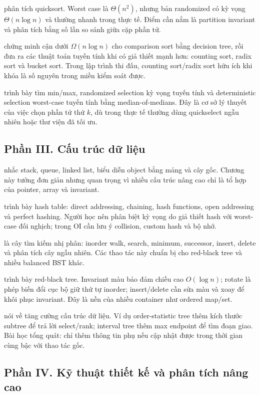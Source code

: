 \documentclass[11pt]{article}
\begin{document}
 phân tích quicksort. Worst case là \(\Theta(n^2)\), nhưng bản
randomized có kỳ vọng \(\Theta(n\log n)\) và thường nhanh trong thực tế. Điểm
cần nắm là partition invariant và phân tích bằng số lần so sánh giữa cặp phần
tử.

 chứng minh cận dưới \(\Omega(n\log n)\) cho comparison sort
bằng decision tree, rồi đưa ra các thuật toán tuyến tính khi có giả thiết mạnh
hơn: counting sort, radix sort và bucket sort. Trong lập trình thi đấu, counting
sort/radix sort hữu ích khi khóa là số nguyên trong miền kiểm soát được.

 trình bày tìm min/max, randomized selection kỳ vọng tuyến tính
và deterministic selection worst-case tuyến tính bằng median-of-medians. Đây là
cơ sở lý thuyết của việc chọn phần tử thứ \(k\), dù trong thực tế thường dùng
quickselect ngẫu nhiên hoặc thư viện đã tối ưu.

\subsection*{Phần III. Cấu trúc dữ liệu}

 nhắc stack, queue, linked list, biểu diễn object bằng mảng và
cây gốc. Chương này tưởng đơn giản nhưng quan trọng vì nhiều cấu trúc nâng cao
chỉ là tổ hợp của pointer, array và invariant.

 trình bày hash table: direct addressing, chaining, hash functions,
open addressing và perfect hashing. Người học nên phân biệt kỳ vọng do giả thiết
hash với worst-case đối nghịch; trong OI cần lưu ý collision, custom hash và bộ
nhớ.

 là cây tìm kiếm nhị phân: inorder walk, search, minimum,
successor, insert, delete và phân tích cây ngẫu nhiên. Các thao tác này chuẩn bị
cho red-black tree và nhiều balanced BST khác.

 trình bày red-black tree. Invariant màu bảo đảm chiều cao
\(O(\log n)\); rotate là phép biến đổi cục bộ giữ thứ tự inorder; insert/delete
cần sửa màu và xoay để khôi phục invariant. Đây là nền của nhiều container như
ordered map/set.

 nói về tăng cường cấu trúc dữ liệu. Ví dụ order-statistic tree
thêm kích thước subtree để trả lời select/rank; interval tree thêm max endpoint để
tìm đoạn giao. Bài học tổng quát: chỉ thêm thông tin phụ nếu cập nhật được trong
thời gian cùng bậc với thao tác gốc.

\subsection*{Phần IV. Kỹ thuật thiết kế và phân tích nâng cao}
\end{document}
